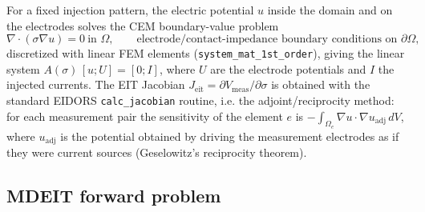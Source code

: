 \documentclass[11pt]{article}
\begin{document}
For a fixed injection pattern, the electric potential $u$ inside the domain and on the electrodes solves the CEM boundary-value problem
\begin{equation}
\nabla\cdot(\sigma\nabla u) = 0 \ \text{in } \Omega, \qquad
\text{electrode/contact-impedance boundary conditions on } \partial\Omega,
\end{equation}
discretized with linear FEM elements (\texttt{system\_mat\_1st\_order}), giving the linear system $A(\sigma)\,[u;U] = [0;I]$, where $U$ are the electrode potentials and $I$ the injected currents. The EIT Jacobian $J_\text{eit} = \partial V_\text{meas}/\partial\sigma$ is obtained with the standard EIDORS \texttt{calc\_jacobian} routine, i.e. the adjoint/reciprocity method: for each measurement pair the sensitivity of the element $e$ is $-\int_{\Omega_e}\nabla u\cdot\nabla u_\text{adj}\,dV$, where $u_\text{adj}$ is the potential obtained by driving the measurement electrodes as if they were current sources (Geselowitz's reciprocity theorem).

\subsection{MDEIT forward problem}
\end{document}

